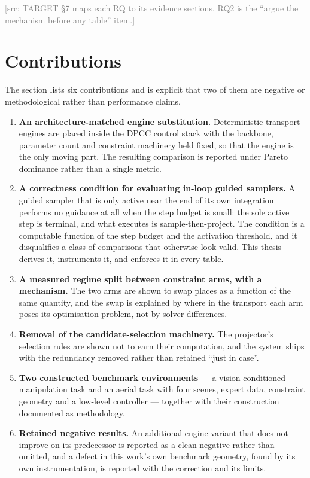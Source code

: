 \documentclass[headsepline,footsepline,footinclude=false,oneside,fontsize=11pt,paper=a4,listof=totoc,bibliography=totoc]{scrbook}
\newcommand{\srcnote}[1]{\textcolor{gray}{\footnotesize\textsf{[src: #1]}}}
\begin{document}
\srcnote{TARGET \S7 maps each RQ to its evidence sections. RQ2 is the ``argue the mechanism
before any table'' item.}

\section{Contributions}\label{sec:intro:contributions}

The section lists six contributions and is explicit that two of them are negative or
methodological rather than performance claims.

\begin{enumerate}
  \item \textbf{An architecture-matched engine substitution.} Deterministic transport
    engines are placed inside the DPCC control stack with the backbone, parameter count and
    constraint machinery held fixed, so that the engine is the only moving part. The
    resulting comparison is reported under Pareto dominance rather than a single metric.
  \item \textbf{A correctness condition for evaluating in-loop guided samplers.} A guided
    sampler that is only active near the end of its own integration performs no guidance at
    all when the step budget is small: the sole active step is terminal, and what executes is
    sample-then-project. The condition is a computable function of the step budget and the
    activation threshold, and it disqualifies a class of comparisons that otherwise look
    valid. This thesis derives it, instruments it, and enforces it in every table.
  \item \textbf{A measured regime split between constraint arms, with a mechanism.} The two
    arms are shown to swap places as a function of the same quantity, and the swap is
    explained by where in the transport each arm poses its optimisation problem, not by
    solver differences.
  \item \textbf{Removal of the candidate-selection machinery.} The projector's selection
    rules are shown not to earn their computation, and the system ships with the redundancy
    removed rather than retained ``just in case''.
  \item \textbf{Two constructed benchmark environments} --- a vision-conditioned
    manipulation task and an aerial task with four scenes, expert data, constraint geometry
    and a low-level controller --- together with their construction documented as
    methodology.
  \item \textbf{Retained negative results.} An additional engine variant that does not
    improve on its predecessor is reported as a clean negative rather than omitted, and a
    defect in this work's own benchmark geometry, found by its own instrumentation, is
    reported with the correction and its limits.
\end{enumerate}
\end{document}
